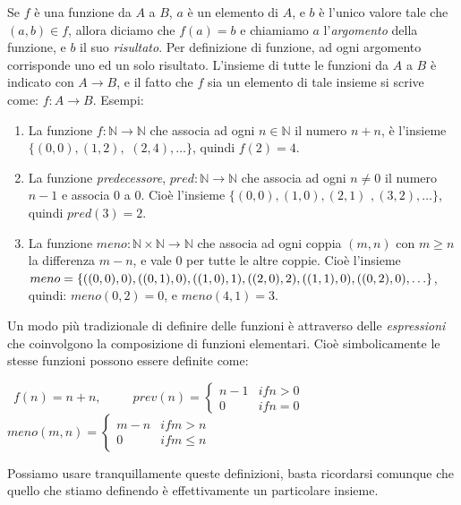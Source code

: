 Se $f$ è una funzione da $A$ a $B$, $a$ è un elemento di $A$, e $b$ è
l'unico valore tale che $(a,b) \in f$, allora diciamo che $f(a) = b$ e
chiamiamo $a$ l'\emph{argomento} della funzione, e $b$ il suo
\emph{risultato}. Per definizione di funzione, ad ogni argomento
corrisponde uno ed un solo risultato. L'insieme di tutte le funzioni
da $A$ a $B$ è indicato con $A \rightarrow B$, e il fatto che $f$ sia
un elemento di tale insieme si scrive come: $f : A \rightarrow B$.
Esempi:

\begin{enumerate}
\item La funzione $f: \mathbb{N} \rightarrow \mathbb{N}$ che associa
  ad ogni $n \in \mathbb{N}$ il numero $n + n$, è l'insieme $\{ (0,0),
  (1,2),$ $ (2,4), \ldots \}$, quindi $f(2) = 4$.
\item La funzione \emph{predecessore}, $pred : \mathbb{N} \rightarrow
  \mathbb{N}$ che associa ad ogni $n \neq 0$ il numero $n - 1$ e
  associa $0$ a $0$. Cioè l'insieme $\{ (0,0),(1,0),(2,1)$
  $,(3,2),\ldots \}$, quindi $pred(3) = 2$.
\item La funzione $meno: \mathbb{N}\times\mathbb{N} \rightarrow
  \mathbb{N}$ che associa ad ogni coppia $(m,n)$ con $m \geq n$ la
  differenza $m-n$, e vale $0$ per tutte le altre coppie. Cioè
  l'insieme
  $meno = \{ ((0,0),0), ((0,1),0),\\
  ((1,0),1),((2,0),2),((1,1),0),((0,2),0),\ldots \}$, quindi:
  $meno(0,2)=0$, e $meno(4,1)=3$.
\end{enumerate}

Un modo più tradizionale di definire delle funzioni è attraverso delle
\emph{espressioni} che coinvolgono la composizione di funzioni
elementari. Cioè simbolicamente le stesse funzioni possono essere
definite come:\medskip

\noindent\mbox{
$f(n) = n + n, \qquad$
$ prev(n) = \begin{cases} n-1 & if n>0\\
                                   0 & if n=0
               \end{cases}\quad$
$meno(m,n) = \begin{cases} m-n & if m>n\\
                  0 & if m \leq n
                 \end{cases}$
}\medskip

Possiamo usare tranquillamente queste definizioni, basta ricordarsi
comunque che quello che stiamo definendo è effettivamente un
particolare insieme.

